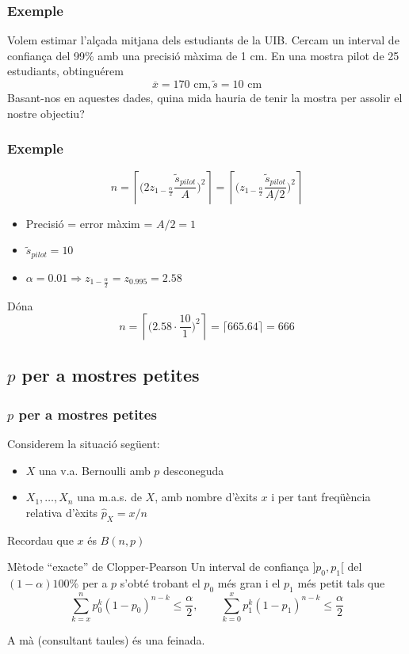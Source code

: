 \documentclass[12pt,t]{beamer}
\renewcommand{\leq}{\leqslant}
\theoremstyle{plain}
\theoremstyle{definition}
\begin{document}
\begin{frame}
\frametitle{Exemple}

Volem estimar l'alçada mitjana dels estudiants de la UIB. Cercam  un interval de confiança del 99\% amb una precisió màxima de 1 cm. En una mostra pilot de 25 estudiants, obtinguérem 
$$
\overline{x} = 170\mbox{ cm}, \widetilde{s}=10\mbox{ cm}
$$
Basant-nos en aquestes dades, quina mida hauria de tenir la mostra per assolir el nostre objectiu?

\end{frame}


\begin{frame}
\frametitle{Exemple}

$$
n=
\left\lceil \Big(2z_{1-\frac{\alpha}{2}}\frac{\widetilde{s}_{pilot}}{A}\Big)^2\right\rceil=
\left\lceil \Big(z_{1-\frac{\alpha}{2}}\frac{\widetilde{s}_{pilot}}{A/2}\Big)^2\right\rceil
$$

\begin{itemize}
\item Precisió = error màxim = ${A}/{2}=1$
\medskip

\item $\widetilde{s}_{pilot}=10$
\medskip

\item $\alpha=0.01\Rightarrow z_{1-\frac{\alpha}{2}}=z_{0.995}=2.58$
\end{itemize}
Dóna
$$
n=\left\lceil \Big(2.58\cdot \frac{10}{1}\Big)^2\right\rceil=\lceil 665.64\rceil=666
$$

\end{frame}



\subsection{$p$ per a mostres petites}


\begin{frame}
\frametitle{$p$ per a mostres petites}

Considerem la situació següent:
\begin{itemize}
\item  $X$ una v.a. Bernoulli amb $p$ desconeguda

\item $X_1,\ldots,X_n$ una m.a.s. de $X$, amb nombre d'èxits $x$ i per tant freqüència relativa d'èxits $\widehat{p}_{X}=x/n$
\end{itemize}

Recordau que $x$ és $B(n,p)$

\begin{block}{Mètode ``exacte'' de Clopper-Pearson}
Un interval de confiança $]p_0,p_1[$ del $(1-\alpha)100\%$ per a $p$ s'obté trobant el $p_0$ més gran i el $p_1$ més petit tals que
$$
\displaystyle\sum_{k=x}^np_0^k(1-p_0)^{n-k}\leq \frac{\alpha}{2},\qquad
\displaystyle\sum_{k=0}^xp_1^k(1-p_1)^{n-k}\leq \frac{\alpha}{2}
$$
\end{block}
A mà (consultant taules) és una feinada.

\end{frame}
\end{document}
